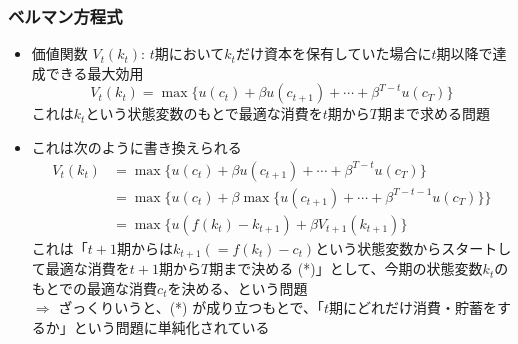 \documentclass[unicode,9pt]{beamer}%
\begin{document}
\begin{frame}\frametitle{ベルマン方程式}
  \begin{itemize}
    \item 価値関数 $V_t(k_t)$: $t$期において$k_t$だけ資本を保有していた場合に$t$期以降で達成できる最大効用
      $$
        V_t(k_t) = \max \{u(c_t) + \beta u(c_{t + 1}) + \cdots + \beta^{T - t} u(c_T) \}
      $$
      これは$k_t$という状態変数のもとで最適な消費を$t$期から$T$期まで求める問題
    \item これは次のように書き換えられる
      \begin{align*}
        V_t(k_t) 
        &= \max \{u(c_t) + \beta u(c_{t + 1}) + \cdots + \beta^{T - t} u(c_T) \} \\
        &= \max \{u(c_t) + \beta \max \{u(c_{t + 1}) + \cdots + \beta^{T - t - 1} u(c_T) \} \} \\
        &= \max \{u(f(k_t) - k_{t+1}) + \beta V_{t+1}(k_{t+1})\}
      \end{align*}
      これは「$t+1$期からは$k_{t+1}(=f(k_t) - c_t)$という状態変数からスタートして最適な消費を$t+1$期から$T$期まで決める (*)」として、今期の状態変数$k_t$のもとでの最適な消費$c_t$を決める、という問題 \\
      $\Rightarrow$ ざっくりいうと、(*) が成り立つもとで、「$t$期にどれだけ消費・貯蓄をするか」という問題に単純化されている
  \end{itemize}
\end{frame}
\end{document}
